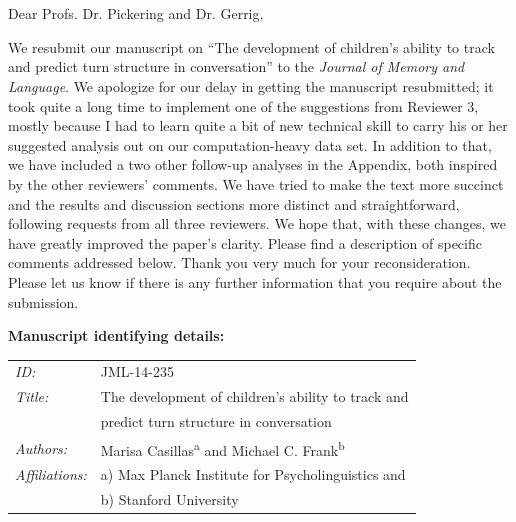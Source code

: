 \documentclass[11pt,a4paper]{letter} %
\def\opening#1{\thispagestyle{empty}
{\centering\fromaddress \vspace{0.6in} \\ %
\hspace*{\longindentation}\hspace*{\fill}\par} %
{\raggedright \toname \\ \toaddress \par} %
\vspace{0.4in} %
\noindent #1 %
}
\begin{document}

\begin{letter}{}


\opening{Dear Profs. Dr. Pickering and Dr. Gerrig,}

\smallskip

We resubmit our manuscript on ``The development of children's ability to track and predict turn structure in conversation'' to the \textit{Journal of Memory and Language}. We apologize for our delay in getting the manuscript resubmitted; it took quite a long time to implement one of the suggestions from Reviewer 3, mostly because I had to learn quite a bit of new technical skill to carry his or her suggested analysis out on our computation-heavy data set. In addition to that, we have included a two other follow-up analyses in the Appendix, both inspired by the other reviewers' comments. We have tried to make the text more succinct and the results and discussion sections more distinct and straightforward, following requests from all three reviewers. We hope that, with these changes, we have greatly improved the paper's clarity. Please find a description of specific comments addressed below. Thank you very much for your reconsideration. Please let us know if there is any further information that you require about the submission.

\textbf{Manuscript identifying details:}

\begin{tabular}{ll}
\textit{ID:} & JML-14-235 \\
\textit{Title:} & The development of children's ability to track and \\
& predict turn structure in conversation \\
\textit{Authors:} & Marisa Casillas\textsuperscript{a} and Michael C. Frank\textsuperscript{b} \\
\textit{Affiliations:} & a) Max Planck Institute for Psycholinguistics and \\
& b) Stanford University
\end{tabular}


\end{letter}
\end{document}
